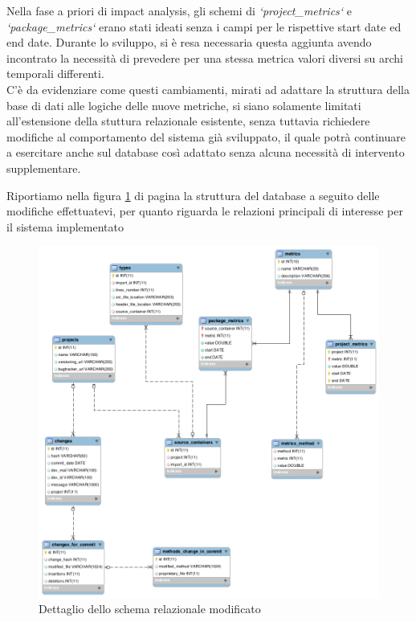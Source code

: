 Nella fase a priori di impact analysis, gli schemi di \textit{`project\_metrics`} e \textit{`package\_metrics`} erano stati ideati senza i campi per le rispettive start date ed end date. Durante lo sviluppo, si è resa necessaria questa aggiunta avendo incontrato la necessità di prevedere per una stessa metrica valori diversi su archi temporali differenti.\\

C'è da evidenziare come questi cambiamenti, mirati ad adattare la struttura della base di dati alle logiche delle nuove metriche, si siano solamente limitati all'estensione della stuttura relazionale esistente, senza tuttavia richiedere modifiche al comportamento del sistema già sviluppato, il quale potrà continuare a esercitare anche sul database così adattato senza alcuna necessità di intervento supplementare. 

Riportiamo nella figura \ref{fig:repominer} di pagina \pageref{fig:repominer} la struttura del database a seguito delle modifiche effettuatevi, per quanto riguarda le relazioni principali di interesse per il sistema implementato

\begin{figure}[t]
	\centering
	\includegraphics[width=\textwidth]{img/repominer.png}
	\caption{Dettaglio dello schema relazionale modificato}\label{fig:repominer}
\end{figure}